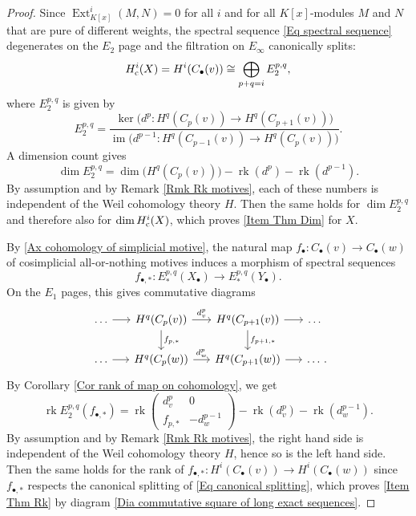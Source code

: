 \documentclass[11pt]{amsart}
\theoremstyle{definition}
\newcommand{\cs}{_{\text{\normalfont c}}}
\newcommand{\Ext}{\operatorname{Ext}}
\newcommand{\rk}{\operatorname{rk}}
\newcommand{\im}{\operatorname{im}}
\newcommand{\punct}[1]{\makebox[0pt][l]{\,#1}} %
\begin{document}
\begin{proof}
Since $\Ext^i_{K[x]}(M,N) = 0$ for all $i$ and for all
$K[x]$-modules $M$ and $N$ that are pure of different weights, the
spectral sequence \eqref{Eq spectral sequence} degenerates on the
$E_2$ page and the filtration on $E_\infty$ canonically splits:
\begin{equation}
H^i\cs(X) = H^i(C_\bullet(v)) \cong \bigoplus_{p+q=i}
E_2^{p,q},\label{Eq canonical splitting}
\end{equation}
where $E_2^{p,q}$ is given by
\[
E_2^{p,q} = \frac{\ker\Big(d^p \colon H^q(C_p(v)) \to
H^q(C_{p+1}(v))\Big)}{\im \Big(d^{p-1} \colon H^q(C_{p-1}(v)) \to
H^q(C_p(v))\Big)}.
\]
A dimension count gives
\[
\dim E_2^{p,q} = \dim\big(H^q(C_p(v))\big) - \rk(d^p) -
\rk(d^{p-1}).
\]
By assumption and by Remark \ref{Rmk Rk motives}, each of these
numbers is independent of the Weil cohomology theory $H$. Then the
same holds for $\dim E_2^{p,q}$ and therefore also for $\dim
H^i\cs(X)$, which proves \ref{Item Thm Dim} for $X$.

By \ref{Ax cohomology of simplicial motive}, the natural map
$f_\bullet \colon C_\bullet(v) \to C_\bullet(w)$ of cosimplicial
all-or-nothing motives induces a morphism of spectral sequences
\[
f_{\bullet,*} \colon E_*^{p,q}(X_\bullet) \to E_*^{p,q}(Y_\bullet).
\]
On the $E_1$ pages, this gives commutative diagrams
\begin{equation*}
\begin{tikzcd}[column sep=1.5em]
\ldots \ar{r} & H^q(C_p(v)) \ar{r}{d^p_v}\ar{d}{f_{p,*}} & H^q(C_{p+1}(v)) \ar{r}\ar{d}{f_{p+1,*}} & \ldots \\
\ldots \ar{r} & H^q(C_p(w)) \ar{r}{d^p_w} & H^q(C_{p+1}(w)) \ar{r} &
\ldots\punct{.}
\end{tikzcd}
\end{equation*}
By Corollary \ref{Cor rank of map on cohomology}, we get
\begin{equation}
\rk E_2^{p,q}(f_{\bullet,*}) = \rk\left(\begin{smallmatrix}d^p_v & 0
\\ f_{p,*} & -d^{p-1}_w\end{smallmatrix}\right) -
\rk\left(d^p_v\right) - \rk\left(d^{p-1}_w\right).\label{Eq rank
E_2}
\end{equation}
By assumption and by Remark \ref{Rmk Rk motives}, the right hand
side is independent of the Weil cohomology theory $H$, hence so is
the left hand side. Then the same holds for the rank of
$f_{\bullet,*} \colon H^i(C_\bullet(v)) \to H^i(C_\bullet(w))$ since
$f_{\bullet,*}$ respects the canonical splitting of \eqref{Eq
canonical splitting}, which proves \ref{Item Thm Rk} by diagram
\eqref{Dia commutative square of long exact sequences}.
\end{proof}
\end{document}
